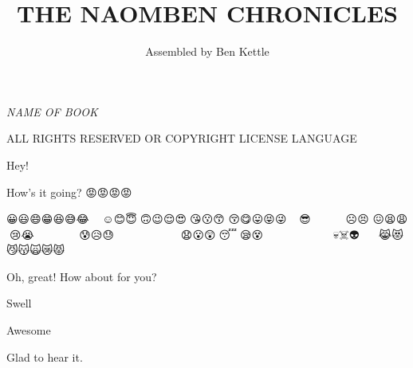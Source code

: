 \documentclass[9pt,mediumvopaper]{memoir}
\author{Assembled by Ben Kettle}
\title{THE NAOMBEN CHRONICLES}
\date{}
\newcommand{\rightmsg}[1]{
\noindent\hfill%
\begin{minipage}{0.8\textwidth}
  \begin{flushright}
    #1
  \end{flushright}
\end{minipage}
\vspace{1mm}
}
\newcommand{\leftmsg}[1]{
\noindent\begin{minipage}{0.8\textwidth}
  #1
\end{minipage}
\vspace{1mm}
}
\begin{document}
\let\cleardoublepage\clearpage

\maketitle






\frontmatter

\null\vfill

\begin{flushleft}
\textit{NAME OF BOOK}
\bigskip





ALL RIGHTS RESERVED OR COPYRIGHT LICENSE LANGUAGE




\end{flushleft}

\newpage
\tableofcontents 

\let\cleardoublepage\clearpage

\mainmatter


\leftmsg{Hey!}

\rightmsg{How's it going? {\emojifont 😡😡😡😡} }

{\emojifont
😀😃😄😁😆😅😂🤣🥲🥹 ☺️😊😇🙂🙃😉😌😍🥰😘😗😙 😚😋😛😝😜🤪🤨🧐🤓😎🥸 🤩🥳😏😒😞😔😟😕🙁☹️😣 😖😫😩🥺😢😭😮‍💨 😤😠😡🤬🤯😳🥵🥶😱😨 😰😥😓🫣🤗🫡🤔🫢🤭🤫 🤥😶😶‍🌫️😐😑😬🫨🫠🙄😯😦 😧😮😲🥱😴🤤😪😵😵‍💫🫥🤐🥴🤢🤮 🤧😷🤒🤕🤑🤠😈👿👹👺🤡💩👻 💀☠️👽👾🤖🎃😺😸 😹😻😼😽🙀😿😾}

\leftmsg{Oh, great! How about for you?}

\rightmsg{Swell}

\leftmsg{Awesome}

\leftmsg{Glad to hear it.}


\end{document}
